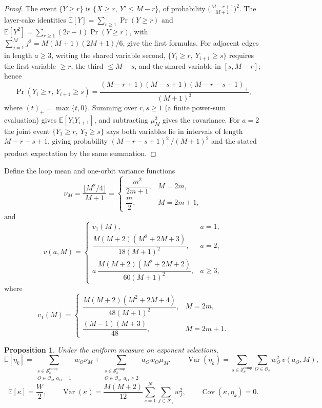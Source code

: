 \documentclass[11pt,a4paper]{article}
\newcommand{\Fs}{\mathcal F_s}
\newcommand{\Os}{\mathcal O_s}
\numberwithin{equation}{section}
\theoremstyle{plain}
\newtheorem{proposition}[theorem]{Proposition}
\theoremstyle{definition}
\theoremstyle{remark}
\begin{document}
\begin{proof}
The event $\{Y\geq r\}$ is $\{X\geq r,\ Y'\leq M-r\}$, of probability
$\bigl(\frac{M-r+1}{M+1}\bigr)^2$.  The layer-cake identities
$\mathbb{E}[Y]=\sum_{r\geq1}\Pr(Y\geq r)$ and
$\mathbb{E}[Y^2]=\sum_{r\geq1}(2r-1)\Pr(Y\geq r)$, with
$\sum_{j=1}^{M}j^2=M(M+1)(2M+1)/6$, give the first formulas.
For adjacent edges in length $a\geq3$, writing the shared variable second,
$\{Y_i\geq r,\ Y_{i+1}\geq s\}$ requires the first variable $\geq r$, the
third $\leq M-s$, and the shared variable in $[s,M-r]$; hence
\[
\Pr(Y_i\geq r,\,Y_{i+1}\geq s)
 =\frac{(M-r+1)(M-s+1)(M-r-s+1)_+}{(M+1)^3},
\]
where $(t)_+=\max\{t,0\}$.  Summing over $r,s\geq1$ (a finite power-sum
evaluation) gives $\mathbb{E}[Y_iY_{i+1}]$, and subtracting $\mu_M^2$ gives
the covariance.  For $a=2$ the joint event
$\{Y_1\geq r,\ Y_2\geq s\}$ says both variables lie in intervals of length
$M-r-s+1$, giving probability $(M-r-s+1)_+^2/(M+1)^2$ and the stated product
expectation by the same summation.
\end{proof}

Define the loop mean and one-orbit variance functions
\[
\nu_M=\frac{\lfloor M^2/4\rfloor}{M+1}
 =\begin{cases}
   \dfrac{m^2}{2m+1},&M=2m,\\[4pt] \dfrac{m}{2},&M=2m+1,
  \end{cases}
\]
and
\[
v(a,M)=
\begin{cases}
v_1(M), & a=1,\\[2pt]
\dfrac{M(M+2)(M^2+2M+3)}{18(M+1)^2}, & a=2,\\[6pt]
a\,\dfrac{M(M+2)(M^2+2M+2)}{60(M+1)^2}, & a\geq3,
\end{cases}
\]
where
\[
v_1(M)=
\begin{cases}
\dfrac{M(M+2)(M^2+2M+4)}{48(M+1)^2},&M=2m,\\[6pt]
\dfrac{(M-1)(M+3)}{48},&M=2m+1.
\end{cases}
\]

\begin{proposition}\label{prop:moments}
Under the uniform measure on exponent selections,
\[
\mathbb{E}[\eta_k]
 =\sum_{\substack{s\in\mathcal{S}_k^{\mathrm{comp}}\\ O\in\Os,\ a_O=1}}
    w_O\nu_M
  +\sum_{\substack{s\in\mathcal{S}_k^{\mathrm{comp}}\\ O\in\Os,\ a_O\geq2}}
    a_Ow_O\mu_M,
\qquad
\operatorname{Var}(\eta_k)
 =\sum_{s\in\mathcal{S}_k^{\mathrm{comp}}}\sum_{O\in\Os}
    w_O^2\,v(a_O,M),
\]
\[
\mathbb{E}[\kappa]=\frac{W}{2},\qquad
\operatorname{Var}(\kappa)
 =\frac{M(M+2)}{12}\sum_{s=1}^{N}\sum_{f\in\Fs}w_f^2,\qquad
\operatorname{Cov}(\kappa,\eta_k)=0.
\]
\end{proposition}
\end{document}
